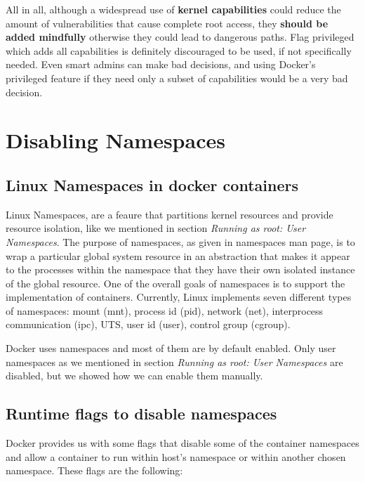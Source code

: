 All in all, although a widespread use of \textbf{kernel capabilities} could reduce the amount of vulnerabilities that cause complete root access, they \textbf{should be added mindfully} otherwise they could lead to dangerous paths. 
Flag privileged which adds all capabilities is definitely discouraged to be used, if not specifically needed. Even smart admins can make bad decisions, and using Docker's privileged feature if they need only a subset of capabilities would be a very bad decision.

\section{Disabling Namespaces}
\subsection{Linux Namespaces in docker containers}
Linux Namespaces, are a feaure that partitions kernel resources and provide resource isolation, like we mentioned in section \textit{Running as root: User Namespaces}.  The purpose of namespaces, as given in namespaces man page, is to wrap a particular global system resource in an abstraction that makes it appear to the processes within the namespace that they have their own isolated instance of the global resource. One of the overall goals of namespaces is to support the implementation of containers. 
Currently, Linux implements seven different types of namespaces: mount (mnt), process id (pid), network (net), interprocess communication (ipc), UTS, user id (user), control group (cgroup).

Docker uses namespaces and most of them are by default enabled. Only user namespaces as we mentioned in section \textit{Running as root: User Namespaces} are disabled, but we showed how we can enable them manually.

\subsection{Runtime flags to disable namespaces}
Docker provides us with some flags that disable some of the container namespaces and allow a container to run within host's namespace or within another chosen namespace. These flags are the following:


